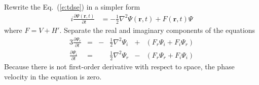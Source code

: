 \documentclass{isildur}
\begin{document}
Rewrite the Eq.~(\ref{e:tdse}) in a simpler form
%
\begin{align}
  i\frac{\partial \Psi(\mathbf{r}, t)}{\partial t}
    &= -\frac{1}{2}\nabla^2\Psi(\mathbf{r}, t) + F(\mathbf{r}, t)\Psi
    \label{e:tdse:simple}
\end{align}
%
where $F = V + H'$.  Separate the real and imaginary components of the
equations
\begin{alignat}{3}
  \frac{\partial \Psi_r}{\partial t} &=
  &-& \frac{1}{2} \nabla^2 \Psi_i &+& (F_r\Psi_i + F_i\Psi_r)
  \label{e:tdse:simple:r} \\
  \frac{\partial \Psi_i}{\partial t} &=
  & & \frac{1}{2} \nabla^2 \Psi_r &-& (F_r\Psi_r + F_i\Psi_i)
  \label{e:tdse:simple:i}
\end{alignat}
%
Because there is not first-order derivative with respect to space, the phase
velocity in the equation is zero.

\clearpage
{}


\end{document}

